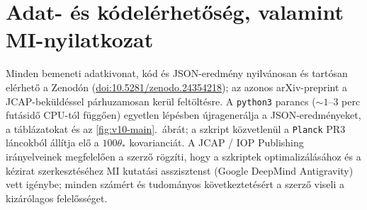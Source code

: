 \documentclass[11pt,a4paper]{article}
\begin{document}
\section*{Adat- \'es k\'odel\'erhet\H{o}s\'eg, valamint MI-nyilatkozat}
{\sloppy Minden bemeneti adatkivonat, k\'od \'es JSON-eredm\'eny nyilv\'anosan \'es tart\'osan el\'erhet\H{o} a Zenod\'on (\href{https://doi.org/10.5281/zenodo.24354218}{doi:10.5281/zenodo.24354218}); az azonos arXiv-preprint a JCAP-bek\"uld\'essel p\'arhuzamosan ker\"ul felt\"olt\'esre. A \texttt{python3}  parancs ($\sim 1\text{--}3$ perc fut\'asid\H{o} CPU-t\'ol f\"ugg\H{o}en) egyetlen l\'ep\'esben \'ujragener\'alja a JSON-eredm\'enyeket, a t\'abl\'azatokat \'es az \ref{fig:v10-main}.\ \'abr\'at; a  szkript k\"ozvetlen\"ul a \texttt{Planck} PR3 l\'ancokb\'ol \'all\'itja el\H{o} a $100\theta_*$ kovarianci\'at. A JCAP / IOP Publishing ir\'anyelveinek megfelel\H{o}en a szerz\H{o} r\"ogz\'iti, hogy a szkriptek optimaliz\'al\'as\'ahoz \'es a k\'ezirat szerkeszt\'es\'ehez MI kutat\'asi asszisztenst (Google DeepMind Antigravity) vett ig\'enybe; minden sz\'am\'ert \'es tudom\'anyos k\"ovetkeztet\'es\'ert a szerz\H{o} viseli a kiz\'ar\'olagos felel\H{o}ss\'eget.\par}
\end{document}
